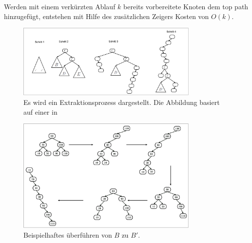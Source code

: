 \documentclass[a4paper,12pt]{article}
\begin{document}
Werden mit einem verkürzten Ablauf $k$ bereits vorbereitete Knoten dem top path hinzugefügt, entstehen mit Hilfe des zusätzlichen Zeigers Kosten von $O\left(k\right)$.   
\begin{figure}[h]
	\centering
	\includegraphics[width= 0.8\textwidth]{"Medien/Zipper/hybrid/extractHybrid"}
	\caption{Es wird ein Extraktionsprozess dargestellt. Die Abbildung basiert auf einer in \cite{zipper} }
	\label{fig:extractHybrid}
\end{figure}
\begin{figure}[h]
	\centering
	\includegraphics[width= 0.8\textwidth]{"Medien/Zipper/hybrid/listeHybrid"}
	\caption{Beispielhaftes überführen von $B$ zu $B'$. }
	\label{fig:listeHybrid}
\end{figure}
\end{document}
